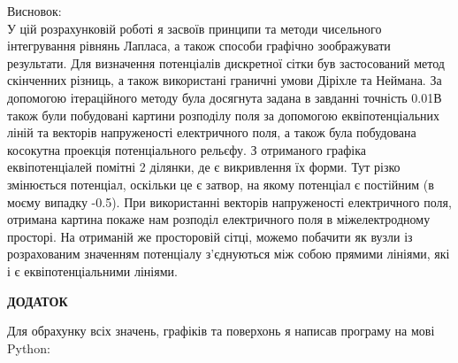 \documentclass[14pt,a4paper]{scrartcl}
\begin{document}
\clearpage
Висновок: \\

У цій розрахунковій роботі я засвоїв принципи та методи чисельного інтегрування рівнянь Лапласа, а також способи графічно зоображувати результати. Для визначення потенціалів дискретної сітки був застосований метод скінченних різниць, а також використані граничні умови Діріхле та Неймана. За допомогою ітераційного методу була досягнута задана в завданні точність 0.01В також були побудовані картини розподілу поля за допомогою еквіпотенціальних ліній та векторів напруженості електричного поля, а також була побудована косокутна проекція потенціального рельєфу. З отриманого графіка еквіпотенціалей помітні 2 ділянки, де є викривлення їх форми. Тут різко змінюється потенціал, оскільки це є затвор, на якому потенціал є постійним (в моєму випадку -0.5). При використанні векторів напруженості електричного поля, отримана картина покаже нам розподіл електричного поля в міжелектродному просторі. На отриманій же просторовій сітці, можемо побачити як вузли із розрахованим значенням потенціалу з’єднуються між собою прямими лініями, які і є еквіпотенціальними лініями.






\clearpage
\begin{center}
\textbf{ДОДАТОК}
\end{center}
Для обрахунку всіх значень, графіків та поверхонь я написав програму на мові Python:\\

\end{document}
